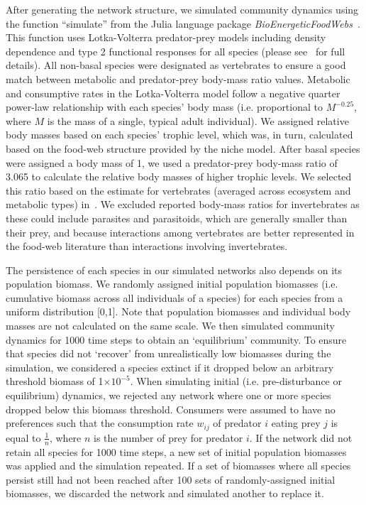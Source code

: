 \documentclass[12pt]{article}
\begin{document}
\begin{spacing}{2.0}
	After generating the network structure, we simulated community dynamics using the function ``simulate'' from the Julia language package \emph{BioEnergeticFoodWebs}~\citep{bioenergeticfw,Delmas2017}. This function uses Lotka-Volterra predator-prey models including density dependence and type 2 functional responses for all species (please see~\citet{Delmas2017} for full details).
	All non-basal species were designated as vertebrates to ensure a good match between metabolic and predator-prey body-mass ratio values. Metabolic and consumptive rates in the Lotka-Volterra model follow a negative quarter power-law relationship with each species' body mass (i.e. proportional to $M^{-0.25}$, where $M$ is the mass of a single, typical adult individual). We assigned relative body masses based on each species' trophic level, which was, in turn, calculated based on the food-web structure provided by the niche model. After basal species were assigned a body mass of 1, we used a predator-prey body-mass ratio of 3.065 to calculate the relative body masses of higher trophic levels. We selected this ratio based on the estimate for vertebrates (averaged across ecosystem and metabolic types) in~\citet{Brose2006}. We excluded reported body-mass ratios for invertebrates as these could include parasites and parasitoids, which are generally smaller than their prey, and because interactions among vertebrates are better represented in the food-web literature than interactions involving invertebrates.
	
	
	The persistence of each species in our simulated networks also depends on its population biomass. 
	We randomly assigned initial population biomasses (i.e. cumulative biomass across all individuals of a species) for each species from a uniform distribution [0,1]. Note that population biomasses and individual body masses are not calculated on the same scale. We then simulated community dynamics for 1000 time steps to obtain an `equilibrium' community. To ensure that species did not `recover' from unrealistically low biomasses during the simulation, we considered a species extinct if it dropped below an arbitrary threshold biomass of 1$\times10^{-5}$. When simulating initial (i.e. pre-disturbance or equilibrium) dynamics, we rejected any network where one or more species dropped below this biomass threshold. Consumers were assumed to have no preferences such that the consumption rate $w_{ij}$ of predator $i$ eating prey $j$ is equal to $\frac{1}{n}$, where $n$ is the number of prey for predator $i$. If the network did not retain all species for 1000 time steps, a new set of initial population biomasses was applied and the simulation repeated.
	If a set of biomasses where all species persist still had not been reached after 100 sets of randomly-assigned initial biomasses, we discarded the network and simulated another to replace it.


\end{spacing}
\end{document}
